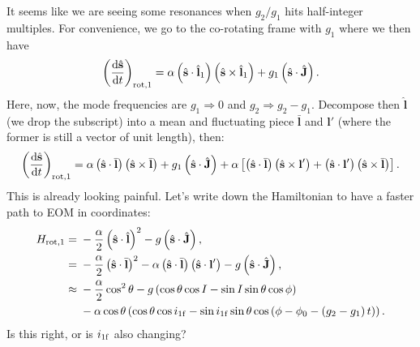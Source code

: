 \documentclass[11pt,
        usenames, %
        dvipsnames %
    ]{article}
\newcommand*{\rd}[2]{\frac{\mathrm{d}#1}{\mathrm{d}#2}}
\newcommand*{\bm}[1]{\boldsymbol{\mathbf{#1}}}
\newcommand*{\uv}[1]{\hat{\bm{#1}}}
\newcommand*{\p}[1]{\left(#1\right)}
\newcommand*{\s}[1]{\left[#1\right]}
\begin{document}
It seems like we are seeing some resonances when $g_2 / g_1$ hits half-integer
multiples. For convenience, we go to the co-rotating frame with $g_1$ where we
then have
\begin{equation}
    \p{\rd{\uv{s}}{t}}_{\rm rot, 1}
        = \alpha\p{\uv{s} \cdot \uv{l}_1}\p{\uv{s} \times \uv{l}_1}
            + g_1\p{\uv{s} \cdot \uv{J}}.
\end{equation}
Here, now, the mode frequencies are $g_1 \Rightarrow 0$ and $g_2 \Rightarrow g_2
- g_1$. Decompose then $\uv{l}$ (we drop the subscript) into a mean and fluctuating
piece $\bar{\bm{l}}$ and $\bm{l}'$ (where the former is still a vector of unit
length), then:
\begin{equation}
    \p{\rd{\uv{s}}{t}}_{\rm rot, 1}
        = \alpha\p{\uv{s} \cdot \bar{\bm{l}}}\p{\uv{s} \times \bar{\bm{l}}}
            + g_1\p{\uv{s} \cdot \uv{J}}
            + \alpha\s{
                \p{\uv{s} \cdot \bar{\bm{l}}}
                \p{\uv{s} \times \bm{l}'} +
                \p{\uv{s} \cdot \bm{l}'}
                \p{\uv{s} \times \bar{\bm{l}}}
            }.
\end{equation}
This is already looking painful. Let's write down the Hamiltonian to have a
faster path to EOM in coordinates:
\begin{align}
    H_{\rm rot, 1} ={}& -\frac{\alpha}{2}\p{\uv{s} \cdot \uv{l}}^2
            - g\p{\uv{s} \cdot \uv{J}},\\
        ={}& -\frac{\alpha}{2}\p{\uv{s} \cdot \bar{\bm{l}}}^2
            - \alpha\p{\uv{s} \cdot \bar{\bm{l}}}
                \p{\uv{s} \cdot \bm{l}'}
            - g\p{\uv{s} \cdot \uv{J}},\\
        \approx{}& -\frac{\alpha}{2}\cos^2\theta
            - g\p{\cos \theta \cos I - \sin I \sin \theta \cos \phi}\nonumber\\
        & - \alpha \cos \theta\p{
            \cos \theta \cos i_{\rm 1f}
            - \sin i_{\rm 1f} \sin \theta \cos \p{\phi - \phi_0 - \p{g_2 -
            g_1}t}}.
\end{align}
Is this right, or is $i_{\rm 1f}$ also changing?
\end{document}
